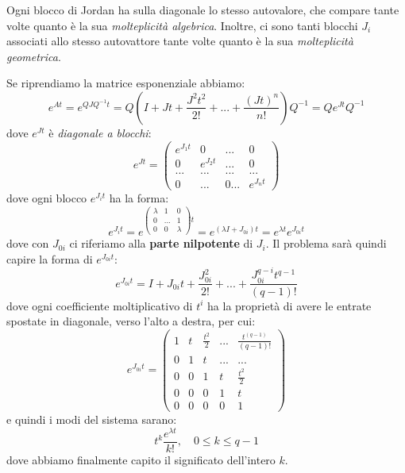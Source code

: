 \documentclass[a4paper,11pt]{article}
\begin{document}
Ogni blocco di Jordan ha sulla diagonale lo stesso autovalore, che compare tante volte quanto è la sua \textit{molteplicità algebrica}.
Inoltre, ci sono tanti blocchi $J_i$ associati allo stesso autovattore tante volte quanto è la sua \textit{molteplicità geometrica}.

\par\smallskip

Se riprendiamo la matrice esponenziale abbiamo:
$$
e^{At} = e^{QJQ^{-1}t} = Q \left( I + Jt + \frac{J^2 t^2}{2!} + ... + \frac{(Jt)^n}{n!} \right) Q^{-1} = Q e^{Jt} Q^{-1}
$$
dove $e^{Jt}$ è \textit{diagonale a blocchi}:
$$
e^{Jt} = \begin{pmatrix}
e^{J_1 t} & 0 & ... & 0 \\
0 & e^{J_2 t} & ... & 0 \\
... & ... & ... & ... \\ 
0 & ... & 0 ... & e^{J_n t}
\end{pmatrix}
$$
dove ogni blocco $e^{J_i t}$ ha la forma:
$$
e^{J_i t} = e^{ \begin{pmatrix}
		\lambda & 1 & 0 \\
		0 & ... & 1 \\ 
		0 & 0 & \lambda
\end{pmatrix} t}
= e^{(\lambda I + J_{0i})t} = e^{\lambda t} e^{J_{0i} t}
$$
dove con $J_{0i}$ ci riferiamo alla \textbf{parte nilpotente} di $J_i$.
Il problema sarà quindi capire la forma di $e^{J_{0i} t}$:
$$
e^{J_{0i} t} = I + J_{0i}t + \frac{J_{0i}^2}{2!} + ... + \frac{J_{0i}^{q - i} t^{q - 1}}{(q - 1)!}
$$
dove ogni coefficiente moltiplicativo di $t^i$ ha la proprietà di avere le entrate spostate in diagonale, verso l'alto a destra, per cui:
$$
e^{J_{0i} t} = \begin{pmatrix}
	1 & t & \frac{t^2}{2} & ... & \frac{t^{(q - 1)}}{(q - 1)!} \\
	0 & 1 & t & ... & ... \\
	0 & 0 & 1 & t & \frac{t^2}{2} \\ 
	0 & 0 & 0 & 1 & t \\
	0 & 0 & 0 & 0 & 1
\end{pmatrix}
$$
e quindi i modi del sistema sarano:
$$
t^k \frac{e^{\lambda t}}{k!}, \quad 0 \leq k \leq q - 1
$$
dove abbiamo finalmente capito il significato dell'intero $k$.
\end{document}
